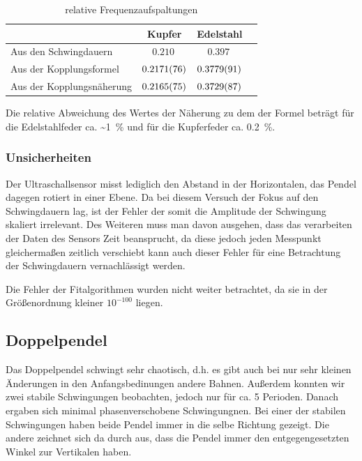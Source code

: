 \documentclass[
	a4paper,
	12pt,
	pagesize,
	ngerman
]{scrartcl}
\begin{document}
	\begin{table}[H]
	\centering
	\begin{tabular}{ l | c | c | c |}
		& Kupfer & Edelstahl  \\ \hline
		Aus den Schwingdauern   &$\SI{0,210}{}$&$\SI{0,397}{}$\\  \hline
		Aus der Kopplungsformel   &$\SI{0,2171 \pm 0,0076}{}$&$\SI{0,3779 \pm 0,0091}{}$\\  \hline
		Aus der Kopplungsnäherung   &$\SI{0,2165 \pm 0,0075}{}$&$\SI{0,3729 \pm 0,0087}{}$\\  \hline
	\end{tabular}
	\caption{relative Frequenzaufspaltungen}
	\end{table}
	\noindent{}Die relative Abweichung des Wertes der Näherung zu dem der Formel beträgt für die Edelstahlfeder ca. \SI{~1}{\%} und für die Kupferfeder ca. \SI{0,2}{\%}.


	
	\subsubsection*{Unsicherheiten}
	Der Ultraschallsensor misst lediglich den Abstand in der Horizontalen, das Pendel dagegen rotiert in einer Ebene. Da bei diesem Versuch der Fokus auf den Schwingdauern lag, ist der Fehler der somit die Amplitude der Schwingung skaliert irrelevant. Des Weiteren muss man davon ausgehen, dass das verarbeiten der Daten des Sensors Zeit beansprucht, da diese jedoch jeden Messpunkt gleichermaßen zeitlich verschiebt kann auch dieser Fehler für eine Betrachtung der Schwingdauern vernachlässigt werden.
	
	
	Die Fehler der Fitalgorithmen wurden nicht weiter betrachtet, da sie in der Größenordnung kleiner $ 10^{-100}$ liegen.


	\subsection{Doppelpendel}
	Das Doppelpendel schwingt sehr chaotisch, d.h. es gibt auch bei nur sehr kleinen Änderungen in den Anfangsbedinungen andere Bahnen. Außerdem konnten wir zwei stabile Schwingungen beobachten, jedoch nur für ca. 5 Perioden. Danach ergaben sich minimal phasenverschobene Schwingungnen. Bei einer der stabilen Schwingungen haben beide Pendel immer in die selbe Richtung gezeigt. Die andere zeichnet sich da durch aus, dass die Pendel immer den entgegengesetzten Winkel zur Vertikalen haben. %
\end{document}
